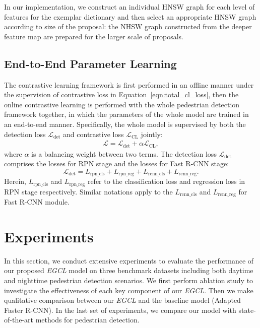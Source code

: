\documentclass[journal]{IEEEtran}
\begin{document}
In our implementation, we construct an individual HNSW graph for each level of features for the exemplar dictionary and then select an appropriate HNSW graph according to size of the proposal: the NHSW graph constructed from the deeper feature map are prepared for the larger scale of proposals. 


\subsection{End-to-End Parameter Learning}
The contrastive learning framework is first performed in an offline manner under the supervision of contrastive loss in Equation~\ref{eqn:total_cl_loss}, then the online contrastive learning is performed with the whole pedestrian detection framework together, in which the parameters of the whole model are trained in an end-to-end manner. Specifically, the whole model is supervised by both the detection loss $\mathcal{L}_{\text{det}}$ and contrastive loss $\mathcal{L}_{\text{CL}}$ jointly:
\begin{align}
\mathcal{L} = \mathcal{L}_{\text{det}} +  \alpha \mathcal{L}_{\text{CL}},
\label{eqn:our-loss}
\end{align}
where $\alpha$ is a balancing weight between two terms. The detection loss $\mathcal{L}_{\text{det}}$ comprises the losses for RPN stage and the losses for Fast R-CNN stage:
\begin{equation}
    \mathcal{L}_{\text{det}} = L_{\text{rpn\_cls}} + L_{\text{rpn\_reg}} + L_{\text{rcnn\_cls}} + L_{\text{rcnn\_reg}}.
\end{equation}
Herein, $L_{\text{rpn\_cls}}$ and $L_{\text{rpn\_reg}}$ refer to the classification loss and regression loss in RPN stage respectively. Similar notations apply to the $L_{\text{rcnn\_cls}}$ and $L_{\text{rcnn\_reg}}$ for Fast R-CNN module.




\section{Experiments}
In this section, we conduct extensive experiments to evaluate the performance of our proposed \emph{EGCL} model on three benchmark datasets including both daytime and nighttime pedestrian detection scenarios. We first perform ablation study to investigate the effectiveness of each key component of our \emph{EGCL}. Then we make qualitative comparison between our \emph{EGCL} and the baseline model (Adapted Faster R-CNN). In the last set of experiments, we compare our model with state-of-the-art methods for pedestrian detection.
\end{document}
